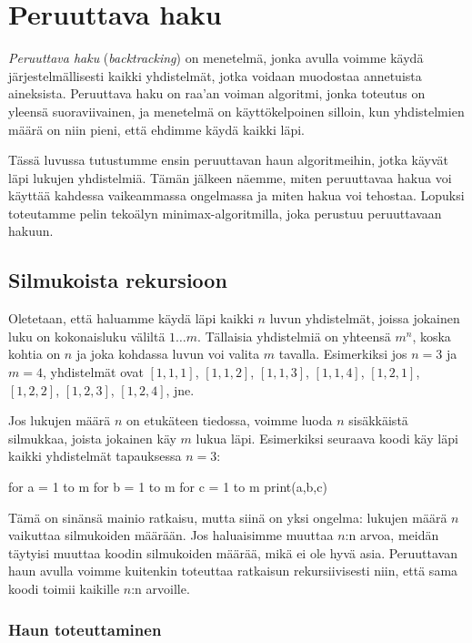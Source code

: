 \chapter{Peruuttava haku}

\emph{Peruuttava haku} (\emph{backtracking}) on menetelmä,
jonka avulla voimme käydä järjestelmällisesti kaikki yhdistelmät,
jotka voidaan muodostaa annetuista aineksista.
Peruuttava haku on raa'an voiman algoritmi,
jonka toteutus on yleensä suoraviivainen,
ja menetelmä on käyttökelpoinen silloin,
kun yhdistelmien määrä on niin pieni, että ehdimme käydä kaikki läpi.

Tässä luvussa tutustumme ensin peruuttavan haun algoritmeihin,
jotka käyvät läpi lukujen yhdistelmiä.
Tämän jälkeen näemme, miten peruuttavaa hakua voi käyttää
kahdessa vaikeammassa ongelmassa ja miten hakua voi tehostaa.
Lopuksi toteutamme pelin tekoälyn minimax-algoritmilla,
joka perustuu peruuttavaan hakuun.

\section{Silmukoista rekursioon}

Oletetaan, että haluamme käydä läpi kaikki $n$ luvun yhdistelmät,
joissa jokainen luku on kokonaisluku väliltä $1 \dots m$.
Tällaisia yhdistelmiä on yhteensä $m^n$,
koska kohtia on $n$ ja joka kohdassa luvun voi valita $m$ tavalla.
Esimerkiksi jos $n=3$ ja $m=4$, yhdistelmät ovat
$[1,1,1]$, $[1,1,2]$, $[1,1,3]$, $[1,1,4]$, $[1,2,1]$,
$[1,2,2]$, $[1,2,3]$, $[1,2,4]$, jne.

Jos lukujen määrä $n$ on etukäteen tiedossa, voimme
luoda $n$ sisäkkäistä silmukkaa, joista jokainen käy $m$ lukua läpi.
Esimerkiksi seuraava koodi käy läpi kaikki yhdistelmät
tapauksessa $n=3$:

\begin{code}
for a = 1 to m
    for b = 1 to m
        for c = 1 to m
            print(a,b,c)
\end{code}

Tämä on sinänsä mainio ratkaisu, mutta siinä on yksi ongelma:
lukujen määrä $n$ vaikuttaa silmukoiden määrään.
Jos haluaisimme muuttaa $n$:n arvoa, meidän täytyisi muuttaa
koodin silmukoiden määrää, mikä ei ole hyvä asia.
Peruuttavan haun avulla voimme kuitenkin toteuttaa ratkaisun
rekursiivisesti niin, että sama koodi toimii kaikille $n$:n arvoille.

\subsection{Haun toteuttaminen}

